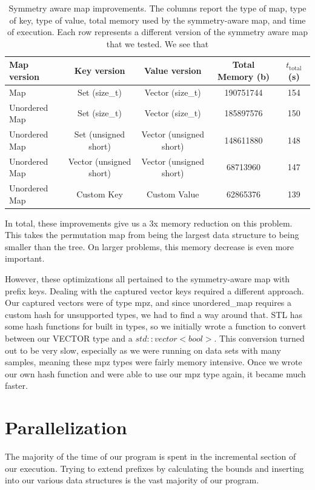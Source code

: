 \begin{table}[t!]
\begin{tabular}{l | c | c | c | c }
Map version & Key version & Value version & Total Memory (b) & $t_\text{total}$ (s)\\
\hline
Map & Set (size\_t) & Vector (size\_t) & 190751744 & 154 \\
Unordered Map & Set (size\_t) & Vector (size\_t) & 185897576 & 150 \\
Unordered Map & Set  (unsigned short) & Vector (unsigned short) & 148611880 & 148 \\
Unordered Map & Vector (unsigned short) & Vector (unsigned short) & 68713960 & 147 \\
Unordered Map & Custom Key & Custom Value & 62865376 & 139 \\
\end{tabular}
\vspace{4mm}
\caption{Symmetry aware map improvements.
%
The columns report the type of map,
type of key, type of value,
total memory used by the symmetry-aware map, and time of execution.
%
Each row represents a different version of the symmetry aware map that we tested.
We see that 
}
\label{tab:pmap}
\end{table}

In total, these improvements give us a 3x memory reduction on this problem.
This takes the permutation map from being the largest data structure to being smaller than the tree.
On larger problems, this memory decrease is even more important.

However, these optimizations all pertained to the symmetry-aware map with prefix keys.
Dealing with the captured vector keys required a different approach.
Our captured vectors were of type mpz, and since unordered\_map requires a custom hash for unsupported types, we had to find a way around that.
STL has some hash functions for built in types, so we initially wrote a function to convert between our VECTOR type and a $std::vector<bool>$.
This conversion turned out to be very slow, especially as we were running on data sets with many samples, meaning these mpz types were fairly memory intensive.
Once we wrote our own hash function and were able to use our mpz type again, it became much faster.

\section{Parallelization}

The majority of the time of our program is spent in the incremental section of our execution.
Trying to extend prefixes by calculating the bounds and inserting into our various data structures is the vast majority of our program.


